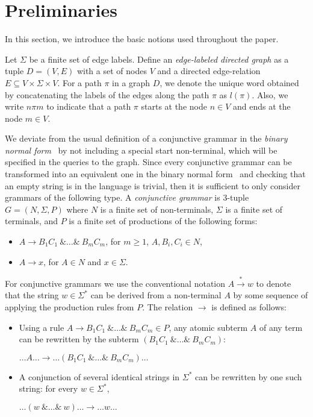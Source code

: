 \section{Preliminaries} \label{section_preliminaries}
In this section, we introduce the basic notions used throughout the paper.

Let $\Sigma$ be a finite set of edge labels. Define an \textit{edge-labeled directed graph} as a tuple $D = (V, E)$ with a set of nodes $V$ and a directed edge-relation $E \subseteq V \times \Sigma \times V$.  For a path $\pi$ in a graph $D$, we denote the unique word obtained by concatenating the labels of the edges along the path $\pi$ as $l(\pi)$. Also, we write $n \pi m$ to indicate that a path $\pi$ starts at the node $n \in V$ and ends at the node $m \in V$.

We deviate from the usual definition of a conjunctive grammar in the \textit{binary normal form}~\cite{okhotinConjAndBool} by not including a special start non-terminal, which will be specified in the queries to the graph. Since every conjunctive grammar can be transformed into an equivalent one in the binary normal form~\cite{okhotinConjAndBool} and checking that an empty string is in the language is trivial, then it is sufficient to only consider grammars of the following type. A \textit{conjunctive grammar} is 3-tuple $G = (N, \Sigma, P)$ where $N$ is a finite set of non-terminals, $\Sigma$ is a finite set of terminals, and $P$ is a finite set of productions of the following forms:

\begin{itemize}
	\item $A \rightarrow B_1 C_1~\& \ldots \&~B_m C_m$, for $m \geq 1$, $A,B_i,C_i \in N$,
	\item $A \rightarrow x$, for $A \in N$ and $x \in \Sigma$.   
\end{itemize}

For conjunctive grammars we use the conventional notation $A \xrightarrow{*} w$ to denote that the string $w \in \Sigma^*$ can be derived from a non-terminal $A$ by some sequence of applying the production rules from $P$. The relation $\rightarrow$ is defined as follows:
\begin{itemize}
	\item Using a rule $A \rightarrow B_1 C_1~\& \ldots \&~B_m C_m \in P$, any atomic subterm $A$ of any term can be rewritten by the subterm $(B_1 C_1 ~\& \ldots \&~ B_m C_m)$:
	\begin{center}
		$\ldots A \ldots \rightarrow \ldots (B_1 C_1~\& \ldots \&~B_m C_m) \ldots$
	\end{center}
	\item A conjunction of several identical strings in $\Sigma^*$ can be rewritten by one such string: for every $w \in \Sigma^*$,
	\begin{center}
		$\ldots (w~\& \ldots \&~w) \ldots \rightarrow \ldots w \ldots$
	\end{center}
	
\end{itemize}

